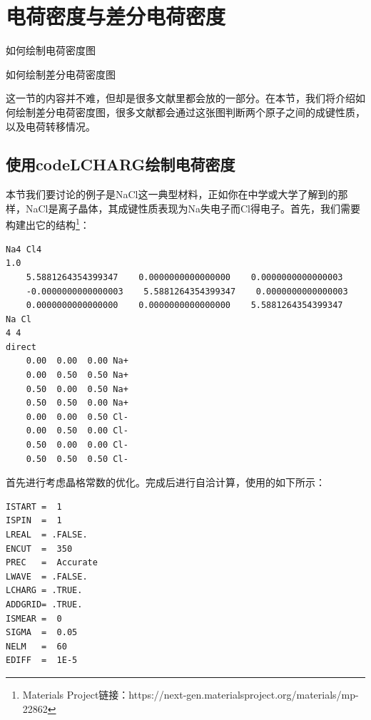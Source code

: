 \section{电荷密度与差分电荷密度}\label{sec:电荷密度与差分电荷密度}

\begin{Abstract}
    \item 如何绘制电荷密度图
    \item 如何绘制差分电荷密度图
\end{Abstract}


这一节的内容并不难，但却是很多文献里都会放的一部分。在本节，我们将介绍如何绘制差分电荷密度图，很多文献都会通过这张图判断两个原子之间的成键性质，以及电荷转移情况。

\subsection{使用code{LCHARG}绘制电荷密度}\label{subsec:电荷密度与差分电荷密度-使用LCHARG绘制电荷密度}

本节我们要讨论的例子是NaCl这一典型材料，正如你在中学或大学了解到的那样，NaCl是离子晶体，其成键性质表现为Na失电子而Cl得电子。首先，我们需要构建出它的结构\footnote{Materials Project链接：https://next-gen.materialsproject.org/materials/mp-22862}：

\begin{lstlisting}[caption=POSCAR]
Na4 Cl4
1.0
    5.5881264354399347    0.0000000000000000    0.0000000000000003
    -0.0000000000000003    5.5881264354399347    0.0000000000000003
    0.0000000000000000    0.0000000000000000    5.5881264354399347
Na Cl
4 4
direct
    0.00  0.00  0.00 Na+
    0.00  0.50  0.50 Na+
    0.50  0.00  0.50 Na+
    0.50  0.50  0.00 Na+
    0.00  0.00  0.50 Cl-
    0.00  0.50  0.00 Cl-
    0.50  0.00  0.00 Cl-
    0.50  0.50  0.50 Cl-
\end{lstlisting}

首先进行考虑晶格常数的优化。完成后进行自洽计算，使用的如下所示：

\begin{lstlisting}[caption=INCAR]
ISTART =  1
ISPIN  =  1
LREAL  = .FALSE.
ENCUT  =  350
PREC   =  Accurate
LWAVE  = .FALSE.
LCHARG = .TRUE.
ADDGRID= .TRUE.
ISMEAR =  0
SIGMA  =  0.05
NELM   =  60
EDIFF  =  1E-5
\end{lstlisting}

